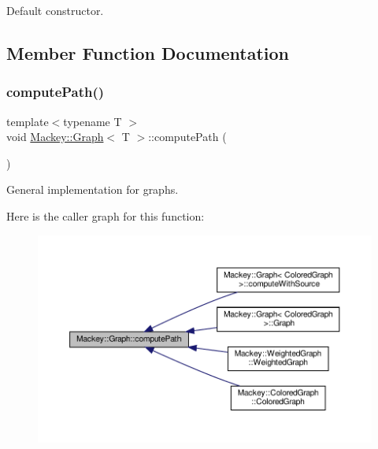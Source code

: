 Default constructor. 



\subsection{Member Function Documentation}
\mbox{\label{classMackey_1_1Graph_a204323cc824bac6c4d393284900f152b}} 
\subsubsection{\texorpdfstring{compute\+Path()}{computePath()}}
{\footnotesize\ttfamily template$<$typename T $>$ \\
void \hyperlink{classMackey_1_1Graph}{Mackey\+::\+Graph}$<$ T $>$\+::compute\+Path (\begin{DoxyParamCaption}{ }\end{DoxyParamCaption})}



General implementation for graphs. 

Here is the caller graph for this function\+:\nopagebreak
\begin{figure}[H]
\begin{center}
\leavevmode
\includegraphics[width=350pt]{classMackey_1_1Graph_a204323cc824bac6c4d393284900f152b_icgraph}
\end{center}
\end{figure}
\mbox{\label{classMackey_1_1Graph_acda32cd8d144dcd1ec771bd8d2753321}} 
